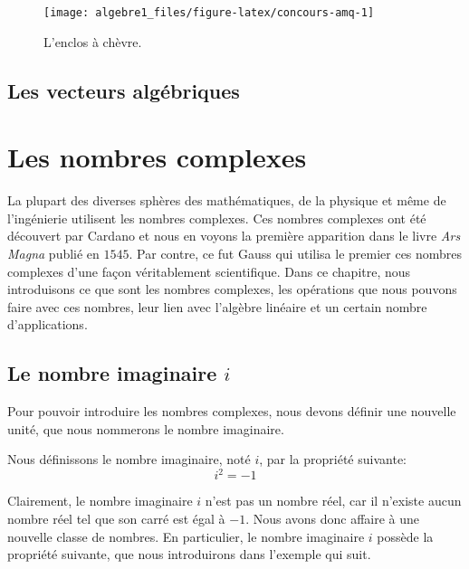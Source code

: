 \documentclass[]{book}
\theoremstyle{definition}
\theoremstyle{definition}
\theoremstyle{definition}
\theoremstyle{remark}
\let\BeginKnitrBlock\begin \let\EndKnitrBlock\end
\begin{document}
\begin{figure}

{\centering \texttt{[image: algebre1\_files/figure-latex/concours-amq-1]} 

}

\caption{L'enclos à chèvre.}\label{fig:concours-amq}
\end{figure}

\hypertarget{les-vecteurs-alguxe9briques}{%
\section{Les vecteurs algébriques}\label{les-vecteurs-alguxe9briques}}

\hypertarget{nombres-complexes}{%
\chapter{Les nombres complexes}\label{nombres-complexes}}

La plupart des diverses sphères des mathématiques, de la physique et même de l'ingénierie utilisent les nombres complexes. Ces nombres complexes ont été découvert par Cardano et nous en voyons la première apparition dans le livre \emph{Ars Magna} publié en \(1545\). Par contre, ce fut Gauss qui utilisa le premier ces nombres complexes d'une façon véritablement scientifique. Dans ce chapitre, nous introduisons ce que sont les nombres complexes, les opérations que nous pouvons faire avec ces nombres, leur lien avec l'algèbre linéaire et un certain nombre d'applications.

\hypertarget{le-nombre-imaginaire-i}{%
\section{\texorpdfstring{Le nombre imaginaire \(i\)}{Le nombre imaginaire i}}\label{le-nombre-imaginaire-i}}

Pour pouvoir introduire les nombres complexes, nous devons définir une nouvelle unité, que nous nommerons le nombre imaginaire.

\BeginKnitrBlock{definition}[Le nombre imaginaire $i$]
\protect\hypertarget{def:unnamed-chunk-140}{}{\label{def:unnamed-chunk-140} {} }Nous définissons le nombre imaginaire, noté \(i\), par la propriété suivante:
\[ i^2 = -1 \]
\EndKnitrBlock{definition}

Clairement, le nombre imaginaire \(i\) n'est pas un nombre réel, car il n'existe aucun nombre réel tel que son carré est égal à \(-1\). Nous avons donc affaire à une nouvelle classe de nombres. En particulier, le nombre imaginaire \(i\) possède la propriété suivante, que nous introduirons dans l'exemple qui suit.
\end{document}
